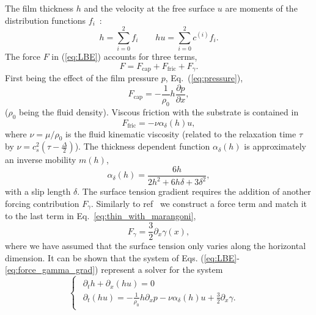 \documentclass[twocolumn,amsmath,amssymb,showpacs,pre,nofootinbib,superscriptaddress]{revtex4-1} %
\begin{document}
The film thickness $h$ and the velocity at the free surface $u$ are moments of the distribution functions $f_i$~\cite{Salmon:1999:0022-2402:503, PhysRevE.65.036309, PhysRevE.104.034801}:
\begin{equation}\label{eq:hydrofields}
    h= \sum_{i=0}^2 f_i \qquad hu = \sum_{i=0}^2 c^{(i)} f_i.
\end{equation}
The force $F$ in (\ref{eq:LBE}) accounts for three terms,
\begin{equation}\label{eq:force}
    F = F_{\text{cap}} + F_{\text{fric}} + F_{\gamma}.  
\end{equation}
First being the effect of the film pressure $p$, Eq.~(\ref{eq:pressure}), 
\begin{equation}\label{eq:capillary_force}
    F_{\text{cap}} = -\frac{1}{\rho_0} h \frac{\partial p}{\partial x},
\end{equation}
($\rho_0$ being the fluid density). 
Viscous friction with the substrate is contained in
\begin{equation}\label{eq:fric_force}
    F_{\text{fric}} = -\nu \alpha_{\delta}(h) u,
\end{equation}
where $\nu=\mu/\rho_0$ is the fluid kinematic viscosity (related to the relaxation time $\tau$ by $\nu = c_s^2\left(\tau-\frac{\Delta}{2}\right)$).
The thickness dependent function $\alpha_{\delta}(h)$ is approximately an inverse mobility $m(h)$,
\begin{equation}\label{eq:fric_alpha}
     \alpha_{\delta}(h) = \frac{6 h}{2h^2 + 6h\delta + 3\delta^2},
\end{equation}
with a slip length $\delta$.
The surface tension gradient requires the addition of another forcing contribution $F_{\gamma}$.
Similarly to ref~\cite{PhysRevE.104.034801} we construct a force term and match it to the last term in Eq.~\ref{eq:thin_with_marangoni}, 
\begin{equation}\label{eq:force_gamma_grad}
    F_{\gamma} = \frac{3}{2}\partial_x\gamma(x),
\end{equation}
where we have assumed that the surface tension only varies along the horizontal dimension.
It can be shown that the system of Eqs. (\ref{eq:LBE}-\ref{eq:force_gamma_grad}) represent a solver for the system
\begin{equation}\label{eq:lubr2eq1surf}
\begin{cases}
\begin{array}{ll}
\partial_t h + \partial_x (h u)  = 0 & \\ 
\partial_t (h u) = -\frac{1}{\rho_0}h\partial_x p -\nu\alpha_{\delta}(h)u + \frac{3}{2}\partial_x\gamma.
\end{array}
\end{cases}
\end{equation}
\end{document}
